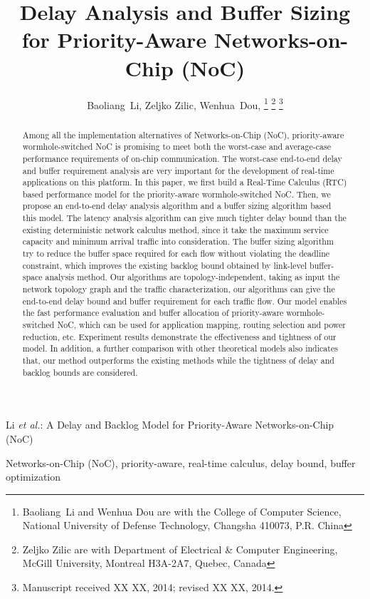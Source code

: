 \documentclass[10pt,journal]{IEEEtran}
\begin{document}
\title{Delay Analysis and Buffer Sizing for Priority-Aware Networks-on-Chip (NoC)}

\author{Baoliang~Li, %
        Zeljko Zilic, %
        Wenhua~Dou, %
\thanks{Baoliang~Li and Wenhua Dou are with the College of Computer Science, National University of Defense Technology, Changsha 410073, P.R. China}%
\thanks{Zeljko Zilic are with Department of Electrical \& Computer Engineering, McGill University, Montreal H3A-2A7, Quebec, Canada}%
\thanks{Manuscript received XX XX, 2014; revised XX XX, 2014.}}

%
{Li \MakeLowercase{\textit{et al.}}: A Delay and Backlog Model for Priority-Aware Networks-on-Chip (NoC)}

\maketitle

\begin{abstract}
Among all the implementation alternatives of Networks-on-Chip (NoC), priority-aware wormhole-switched NoC is promising to meet both the worst-case and average-case performance requirements of on-chip communication. The worst-case end-to-end delay and buffer requirement analysis are very important for the development of real-time applications on this platform. In this paper, we first build a Real-Time Calculus (RTC) based performance model for the priority-aware wormhole-switched NoC. Then, we propose an end-to-end delay analysis algorithm and a buffer sizing algorithm based this model. The latency analysis algorithm can give much tighter delay bound than the existing deterministic network calculus method, since it take the maximum service capacity and minimum arrival traffic into consideration. The buffer sizing algorithm try to reduce the buffer space required for each flow without violating the deadline constraint, which improves the existing backlog bound obtained by link-level buffer-space analysis method. Our algorithms are topology-independent, taking as input the network topology graph and the traffic characterization, our algorithms can give the end-to-end delay bound and buffer requirement for each traffic flow. Our model enables the fast performance evaluation and buffer allocation of priority-aware wormhole-switched NoC, which can be used for application mapping, routing selection and power reduction, etc. Experiment results demonstrate the effectiveness and tightness of our model. In addition, a further comparison with other theoretical models also indicates that, our method outperforms the existing methods while the tightness of delay and backlog bounds are considered.
\end{abstract}
\begin{IEEEkeywords}
Networks-on-Chip (NoC), priority-aware, real-time calculus, delay bound, buffer optimization
\end{IEEEkeywords}
\end{document}

